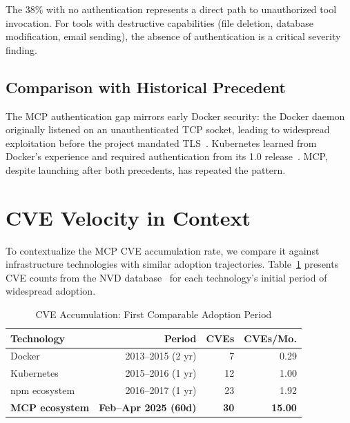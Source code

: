 \documentclass[11pt,twocolumn]{article}
\begin{document}
The 38\% with no authentication represents a direct path to unauthorized tool invocation. For tools with destructive capabilities (file deletion, database modification, email sending), the absence of authentication is a critical severity finding.

\subsection{Comparison with Historical Precedent}

The MCP authentication gap mirrors early Docker security: the Docker daemon originally listened on an unauthenticated TCP socket, leading to widespread exploitation before the project mandated TLS~\cite{docker-security}. Kubernetes learned from Docker's experience and required authentication from its 1.0 release~\cite{k8s-auth}. MCP, despite launching after both precedents, has repeated the pattern.

\section{CVE Velocity in Context}
\label{sec:velocity}

To contextualize the MCP CVE accumulation rate, we compare it against infrastructure technologies with similar adoption trajectories. Table~\ref{tab:velocity} presents CVE counts from the NVD database~\cite{nvd} for each technology's initial period of widespread adoption.

\begin{table}[t]
\centering
\caption{CVE Accumulation: First Comparable Adoption Period}
\label{tab:velocity}
\begin{tabular}{@{}lrrr@{}}
\toprule
\textbf{Technology} & \textbf{Period} & \textbf{CVEs} & \textbf{CVEs/Mo.} \\
\midrule
Docker & 2013--2015 (2 yr) & 7 & 0.29 \\
Kubernetes & 2015--2016 (1 yr) & 12 & 1.00 \\
npm ecosystem & 2016--2017 (1 yr) & 23 & 1.92 \\
\textbf{MCP ecosystem} & \textbf{Feb--Apr 2025 (60d)} & \textbf{30} & \textbf{15.00} \\
\bottomrule
\end{tabular}
\end{table}
\end{document}
